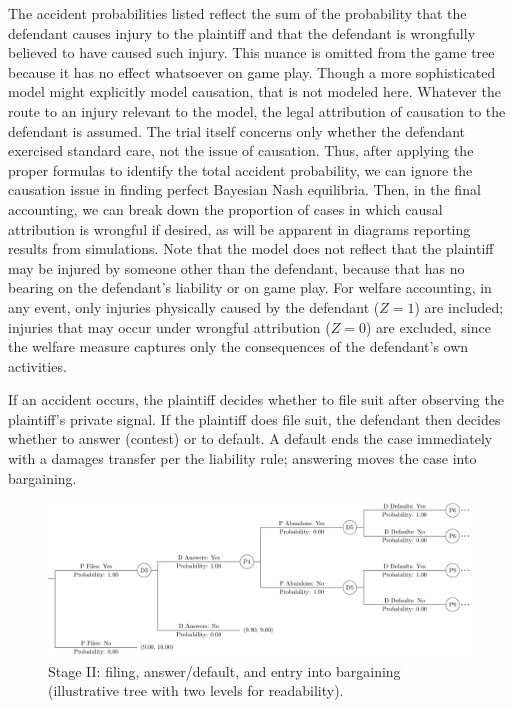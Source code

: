 \documentclass{article}
\begin{document}
The accident probabilities listed reflect the sum of the probability that the defendant causes injury to the plaintiff and that the defendant is wrongfully believed to have caused such injury. This nuance is omitted from the game tree because it has no effect whatsoever on game play. Though a more sophisticated model might explicitly model causation, that is not modeled here. Whatever the route to an injury relevant to the model, the legal attribution of causation to the defendant is assumed. The trial itself concerns only whether the defendant exercised standard care, not the issue of causation. Thus, after applying the proper formulas to identify the total accident probability, we can ignore the causation issue in finding perfect Bayesian Nash equilibria. Then, in the final accounting, we can break down the proportion of cases in which causal attribution is wrongful if desired, as will be apparent in diagrams reporting results from simulations. Note that the model does not reflect that the plaintiff may be injured by someone other than the defendant, because that has no bearing on the defendant's liability or on game play. For welfare accounting, in any event, only injuries physically caused by the defendant ($Z=1$) are included; injuries that may occur under wrongful attribution ($Z=0$) are excluded, since the welfare measure captures only the consequences of the defendant’s own activities.

If an accident occurs, the plaintiff decides whether to file suit after observing the plaintiff's private signal. If the plaintiff does file suit, the defendant then decides whether to answer (contest) or to default. A default ends the case immediately with a damages transfer per the liability rule; answering moves the case into bargaining.

  \begin{figure}[t]
    \centering
    \includegraphics[width=\textwidth]{../Figures/smalltree_mid.pdf}
    \caption{Stage II: filing, answer/default, and entry into bargaining (illustrative tree with two levels for readability).}
    \label{fig:smalltree_mid}
  \end{figure}
\end{document}

